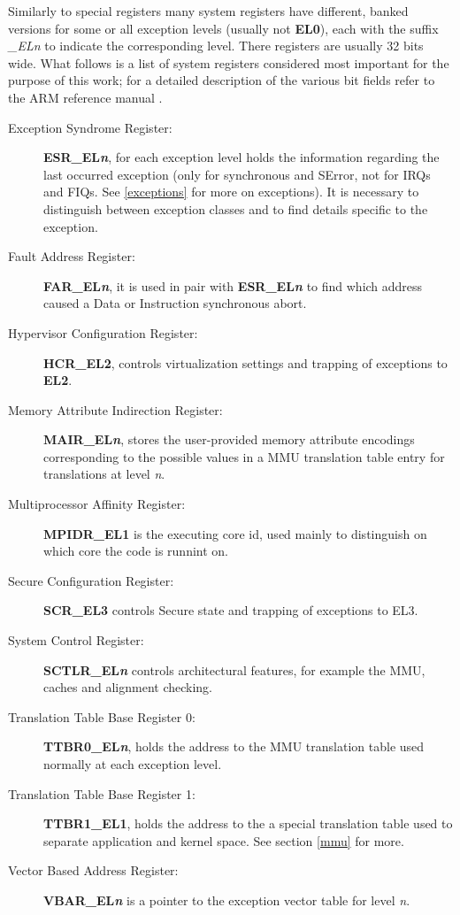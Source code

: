 \documentclass[12pt,a4paper,openright,twoside]{report}
\begin{document}
Similarly to special registers many system registers have different, banked versions
for some or all exception levels (usually not \textbf{EL0}), each with the
suffix \textit{\_ELn} to indicate the corresponding level.
There registers are usually 32 bits wide. What follows is a list of system registers
considered most important for the purpose of this work; for a detailed description
of the various bit fields refer to the ARM reference manual \cite{armarm}.
\begin{description}
    \item[Exception Syndrome Register:] \textbf{ESR\_EL\textit{n}}, for each exception 
        level holds the information regarding the last occurred exception (only
        for synchronous and SError, not for IRQs and FIQs. See \ref{exceptions}
        for more on exceptions). It is necessary to distinguish between exception
        classes and to find details specific to the exception.
    \item[Fault Address Register:] \textbf{FAR\_EL\textit{n}}, it is used in pair 
        with \textbf{ESR\_EL\textit{n}} to find which address caused a Data or 
        Instruction synchronous abort.
    \item[Hypervisor Configuration Register:] \textbf{HCR\_EL2}, controls 
    virtualization settings and trapping of exceptions to \textbf{EL2}.
    \item[Memory Attribute Indirection Register:] \textbf{MAIR\_EL\textit{n}}, 
        stores the user-provided memory attribute encodings corresponding to the
        possible values in a MMU translation table entry for translations at level \textit{n}.
    \item[Multiprocessor Affinity Register:] \textbf{MPIDR\_EL1} is the 
        executing core id, used mainly to distinguish on which core the code is 
        runnint on.
    \item[Secure Configuration Register:] \textbf{SCR\_EL3} controls Secure 
    state and trapping of exceptions to EL3.
    \item[System Control Register:] \textbf{SCTLR\_EL\textit{n}} controls 
    architectural features, for example the MMU, caches and alignment checking.
    \item[Translation Table Base Register 0:] \textbf{TTBR0\_EL\textit{n}}, holds
        the address to the MMU translation table used normally at each exception level.
    \item[Translation Table Base Register 1:] \textbf{TTBR1\_EL1}, holds
        the address to the a special translation table used to separate application
        and kernel space. See section \ref{mmu} for more.
    \item[Vector Based Address Register:] \textbf{VBAR\_EL\textit{n}} is a pointer 
        to the exception vector table for level \textit{n}.
\end{description}
\end{document}
